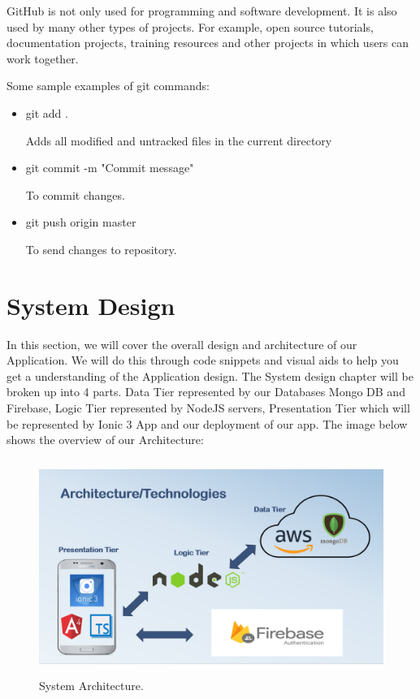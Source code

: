 GitHub is not only used for programming and software development. It is also used by many other types of projects. For example, open source tutorials, documentation projects, training resources and other projects in which users can work together. \cite{GitHub}\par

Some sample examples of git commands:
\begin{itemize}

    \item git add .\par
    Adds all modified and untracked files in the current directory
    
    \item git commit -m "Commit message"\par
    To commit changes.
    
    \item git push origin master\par
    To send changes to repository. 
\end{itemize}

\chapter{System Design}

In this section, we will cover the overall design and architecture of our Application. We will do this through code snippets and visual aids to help you get a understanding of the Application design. The System design chapter will be broken up into 4 parts. Data Tier represented by our Databases Mongo DB and Firebase, Logic Tier represented by NodeJS servers, Presentation Tier which will be represented by Ionic 3 App and our deployment of our app. 
The image below shows the overview of our Architecture:

\begin{figure}[h]
\centering
\includegraphics[width=14cm, height=7cm]{img/Architecture}
\caption{System Architecture.}
\end{figure}

